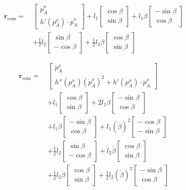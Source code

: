 \documentclass[10pt]{article}
\begin{document}
\begin{align*}
\dot{\mathbf{r}}_{\text{com}} =\ &
\begin{bmatrix}
\dot{p}_A^x \\
h'(p_A^x) \cdot \dot{p}_A^x
\end{bmatrix}
+
\dot{l}_1
\begin{bmatrix}
\cos\beta \\
\sin\beta
\end{bmatrix}
+
l_1 \dot{\beta}
\begin{bmatrix}
-\sin\beta \\
\cos\beta
\end{bmatrix} \\
&+
\frac{1}{2} \dot{l}_2
\begin{bmatrix}
\sin\beta \\
-\cos\beta
\end{bmatrix}
+
\frac{1}{2} l_2 \dot{\beta}
\begin{bmatrix}
\cos\beta \\
\sin\beta
\end{bmatrix}
\end{align*}

\begin{align*}
\ddot{\mathbf{r}}_{\text{com}} =\ &
\begin{bmatrix}
\ddot{p}_A^x \\
h''(p_A^x)(\dot{p}_A^x)^2 + h'(p_A^x) \cdot \ddot{p}_A^x
\end{bmatrix} \\
&+
\ddot{l}_1
\begin{bmatrix}
\cos\beta \\
\sin\beta
\end{bmatrix}
+
2 \dot{l}_1 \dot{\beta}
\begin{bmatrix}
-\sin\beta \\
\cos\beta
\end{bmatrix} \\
&+
l_1 \ddot{\beta}
\begin{bmatrix}
-\sin\beta \\
\cos\beta
\end{bmatrix}
+
l_1 (\dot{\beta})^2
\begin{bmatrix}
-\cos\beta \\
-\sin\beta
\end{bmatrix} \\
&+
\frac{1}{2} \ddot{l}_2
\begin{bmatrix}
\sin\beta \\
-\cos\beta
\end{bmatrix}
+
\dot{l}_2 \dot{\beta}
\begin{bmatrix}
\cos\beta \\
\sin\beta
\end{bmatrix} \\
&+
\frac{1}{2} l_2 \ddot{\beta}
\begin{bmatrix}
\cos\beta \\
\sin\beta
\end{bmatrix}
+
\frac{1}{2} l_2 (\dot{\beta})^2
\begin{bmatrix}
-\sin\beta \\
\cos\beta
\end{bmatrix}
\end{align*}
\end{document}
